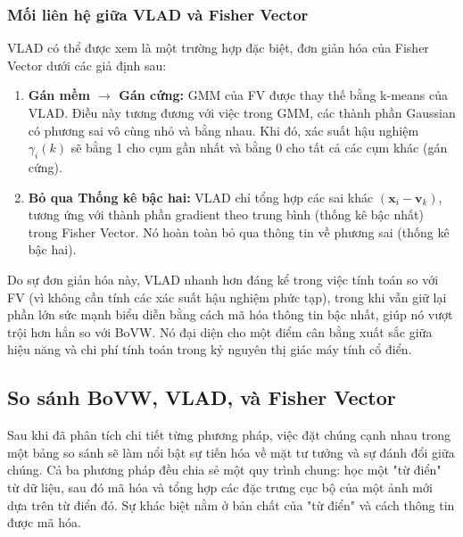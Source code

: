 \subsubsection{Mối liên hệ giữa VLAD và Fisher Vector}
\label{subsubsec:vlad_vs_fv}
VLAD có thể được xem là một trường hợp đặc biệt, đơn giản hóa của Fisher Vector dưới các giả định sau:
\begin{enumerate}
    \item \textbf{Gán mềm $\rightarrow$ Gán cứng:} GMM của FV được thay thế bằng k-means của VLAD. Điều này tương đương với việc trong GMM, các thành phần Gaussian có phương sai vô cùng nhỏ và bằng nhau. Khi đó, xác suất hậu nghiệm $\gamma_i(k)$ sẽ bằng 1 cho cụm gần nhất và bằng 0 cho tất cả các cụm khác (gán cứng).
    \item \textbf{Bỏ qua Thống kê bậc hai:} VLAD chỉ tổng hợp các sai khác $(\mathbf{x}_i - \mathbf{v}_k)$, tương ứng với thành phần gradient theo trung bình (thống kê bậc nhất) trong Fisher Vector. Nó hoàn toàn bỏ qua thông tin về phương sai (thống kê bậc hai).
\end{enumerate}
Do sự đơn giản hóa này, VLAD nhanh hơn đáng kể trong việc tính toán so với FV (vì không cần tính các xác suất hậu nghiệm phức tạp), trong khi vẫn giữ lại phần lớn sức mạnh biểu diễn bằng cách mã hóa thông tin bậc nhất, giúp nó vượt trội hơn hẳn so với BoVW. Nó đại diện cho một điểm cân bằng xuất sắc giữa hiệu năng và chi phí tính toán trong kỷ nguyên thị giác máy tính cổ điển.

\subsection{So sánh BoVW, VLAD, và Fisher Vector}
\label{subsec:bovw_vlad_fv_comparison}

Sau khi đã phân tích chi tiết từng phương pháp, việc đặt chúng cạnh nhau trong một bảng so sánh sẽ làm nổi bật sự tiến hóa về mặt tư tưởng và sự đánh đổi giữa chúng. Cả ba phương pháp đều chia sẻ một quy trình chung: học một "từ điển" từ dữ liệu, sau đó mã hóa và tổng hợp các đặc trưng cục bộ của một ảnh mới dựa trên từ điển đó. Sự khác biệt nằm ở bản chất của "từ điển" và cách thông tin được mã hóa.

